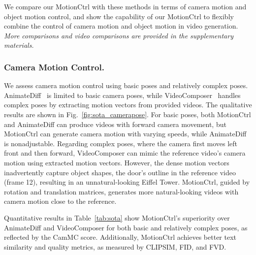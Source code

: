 \documentclass[sigconf]{acmart}
\begin{document}
We compare our MotionCtrl with these methods in terms of camera motion and object motion control, and show the capability of our MotionCtrl to flexibly combine the control of camera motion and object motion in video generation. \textit{More comparisons and video comparisons are provided in the supplementary materials.}

\subsubsection{Camera Motion Control.}
We assess camera motion control using basic poses and relatively complex poses. AnimateDiff~\cite{guo2023animatediff} is limited to basic camera poses, while VideoComposer~\cite{wang2023videocomposer} handles complex poses by extracting motion vectors from provided videos. The qualitative results are shown in Fig.~\ref{fig:sota_camerapose}. For basic poses, both MotionCtrl and AnimateDiff can produce videos with forward camera movement, but MotionCtrl can generate camera motion with varying speeds, while AnimateDiff is nonadjustable. Regarding complex poses, where the camera first moves left front and then forward, VideoComposer can mimic the reference video's camera motion using extracted motion vectors. However, the dense motion vectors inadvertently capture object shapes, the door's outline in the reference video (frame 12), resulting in an unnatural-looking Eiffel Tower. MotionCtrl, guided by rotation and translation matrices, generates more natural-looking videos with camera motion close to the reference.

Quantitative results in Table~\ref{tab:sota} show MotionCtrl's superiority over AnimateDiff and VideoComposer for both basic and relatively complex poses, as reflected by the CamMC score. Additionally, MotionCtrl achieves better text similarity and quality metrics, as measured by CLIPSIM, FID, and FVD.
\end{document}

